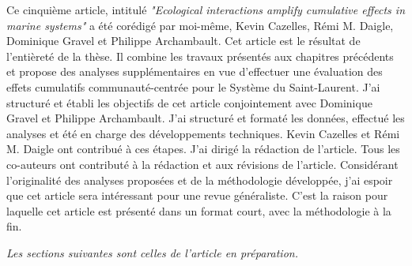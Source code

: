 Ce cinquième article, intitulé \textit{"Ecological interactions amplify cumulative effects in marine systems"} a été corédigé par moi-même, Kevin Cazelles, Rémi M. Daigle, Dominique Gravel et Philippe Archambault. Cet article est le résultat de l'entièreté de la thèse. Il combine les travaux présentés aux chapitres précédents et propose des analyses supplémentaires en vue d'effectuer une évaluation des effets cumulatifs communauté-centrée pour le Système du Saint-Laurent. J'ai structuré et établi les objectifs de cet article conjointement avec Dominique Gravel et Philippe Archambault. J'ai structuré et formaté les données, effectué les analyses et été en charge des développements techniques. Kevin Cazelles et Rémi M. Daigle ont contribué à ces étapes. J'ai dirigé la rédaction de l'article. Tous les co-auteurs ont contributé à la rédaction et aux révisions de l'article. Considérant l'originalité des analyses proposées et de la méthodologie développée, j'ai espoir que cet article sera intéressant pour une revue généraliste. C'est la raison pour laquelle cet article est présenté dans un format court, avec la méthodologie à la fin. \linebreak[4]


\textit{Les sections suivantes sont celles de l'article en préparation.}
